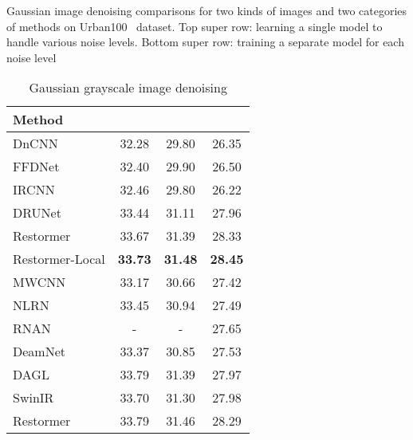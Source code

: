 \documentclass[runningheads]{llncs}
\begin{document}
 

\begin{table*}[t]
\centering
\caption{
{Gaussian image denoising} comparisons for two kinds of images and two categories of methods on Urban100~\cite{huang2015single} dataset. Top super row: learning a single model to handle various noise levels. Bottom super row: training a separate model for each noise level}
\label{tab:denoise}
\begin{subtable}[t]{0.48\linewidth}
\scriptsize
\centering
\setlength{\tabcolsep}{3pt}
\caption{Gaussian grayscale image denoising} 
\label{table:grayscaledenoising}
\begin{tabular}{l|ccc}
\toprule
{Method}                     &    &    &    \\ \midrule
DnCNN~\cite{zhang2017beyond}                    & 32.28             & 29.80             & 26.35             \\
FFDNet~\cite{zhang2018ffdnet}              & 32.40             & 29.90             & 26.50             \\
IRCNN~\cite{zhang2017learning}        & 32.46             & 29.80             & 26.22             \\
DRUNet~\cite{zhang2021plug}           & 33.44             & 31.11             & 27.96             \\ \midrule
Restormer~\cite{zamir2021restormer}   & {33.67} & {31.39} & {28.33} \\ 
{Restormer-Local}              & \textbf{33.73}             & \textbf{31.48}             & \textbf{28.45}             \\\midrule \midrule
MWCNN~\cite{liu2018multi}             & 33.17             & 30.66             & 27.42             \\
NLRN~\cite{liu2018non}               & 33.45             & 30.94             & 27.49             \\
RNAN~\cite{zhang2019residual}         & -                 & -                 & 27.65             \\
DeamNet~\cite{ren2021adaptive} & 33.37             & 30.85             & 27.53             \\
DAGL~\cite{mou2021dynamic}        & 33.79             & 31.39             & 27.97             \\
SwinIR~\cite{liang2021swinir}         & 33.70              & 31.30              & 27.98             \\ \midrule
Restormer~\cite{zamir2021restormer}   & {33.79} & {31.46} & {28.29} \\

\end{tabular}
\end{subtable}
\end{table*}
\end{document}
